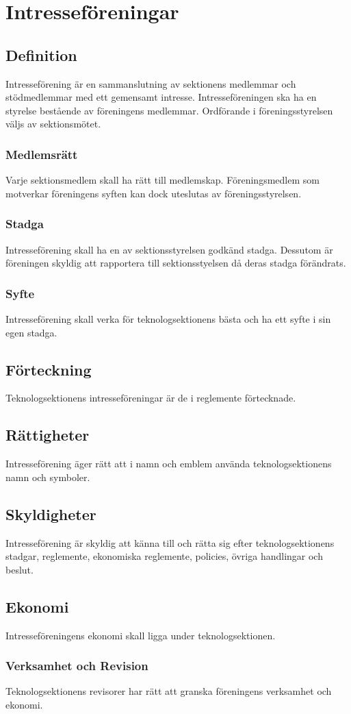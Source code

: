 \section{Intresseföreningar}
\subsection{Definition}
Intresseförening är en sammanslutning av sektionens medlemmar och stödmedlemmar med ett gemensamt intresse.
Intresseföreningen ska ha en styrelse bestående av föreningens medlemmar.
Ordförande i föreningsstyrelsen väljs av sektionsmötet.
\subsubsection{Medlemsrätt}
Varje sektionsmedlem skall ha rätt till medlemskap.
Föreningsmedlem som motverkar föreningens syften kan dock uteslutas av föreningsstyrelsen.
\subsubsection{Stadga}
Intresseförening skall ha en av sektionsstyrelsen godkänd stadga.
Dessutom är föreningen skyldig att rapportera till sektionsstyelsen då deras stadga förändrats.
\subsubsection{Syfte}
Intresseförening skall verka för teknologsektionens bästa och ha ett syfte i sin egen stadga.
\subsection{Förteckning}
Teknologsektionens intresseföreningar är de i reglemente förtecknade.
\subsection{Rättigheter}
Intresseförening äger rätt att i namn och emblem använda teknologsektionens namn och symboler.
\subsection{Skyldigheter}
Intresseförening är skyldig att känna till och rätta sig efter teknologsektionens stadgar, reglemente, ekonomiska reglemente, policies, övriga handlingar och beslut.
\subsection{Ekonomi}
Intresseföreningens ekonomi skall ligga under teknologsektionen.
\subsubsection{Verksamhet och Revision}
Teknologsektionens revisorer har rätt att granska föreningens verksamhet och ekonomi.
